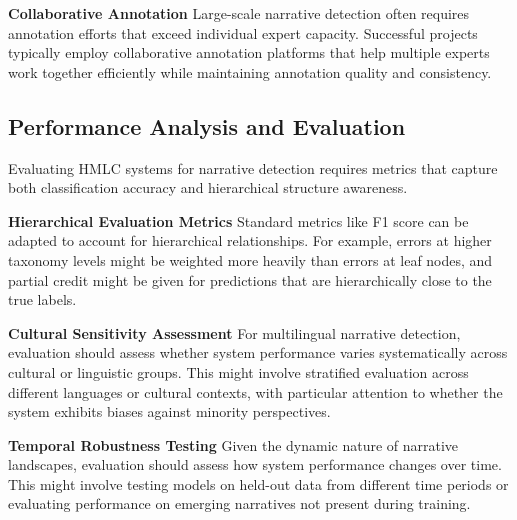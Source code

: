 \textbf{Collaborative Annotation} Large-scale narrative detection often requires annotation efforts that exceed individual expert capacity. Successful projects typically employ collaborative annotation platforms that help multiple experts work together efficiently while maintaining annotation quality and consistency.

\subsection{Performance Analysis and Evaluation}

Evaluating HMLC systems for narrative detection requires metrics that capture both classification accuracy and hierarchical structure awareness.

\textbf{Hierarchical Evaluation Metrics} Standard metrics like F1 score can be adapted to account for hierarchical relationships. For example, errors at higher taxonomy levels might be weighted more heavily than errors at leaf nodes, and partial credit might be given for predictions that are hierarchically close to the true labels.

\textbf{Cultural Sensitivity Assessment} For multilingual narrative detection, evaluation should assess whether system performance varies systematically across cultural or linguistic groups. This might involve stratified evaluation across different languages or cultural contexts, with particular attention to whether the system exhibits biases against minority perspectives.

\textbf{Temporal Robustness Testing} Given the dynamic nature of narrative landscapes, evaluation should assess how system performance changes over time. This might involve testing models on held-out data from different time periods or evaluating performance on emerging narratives not present during training.
